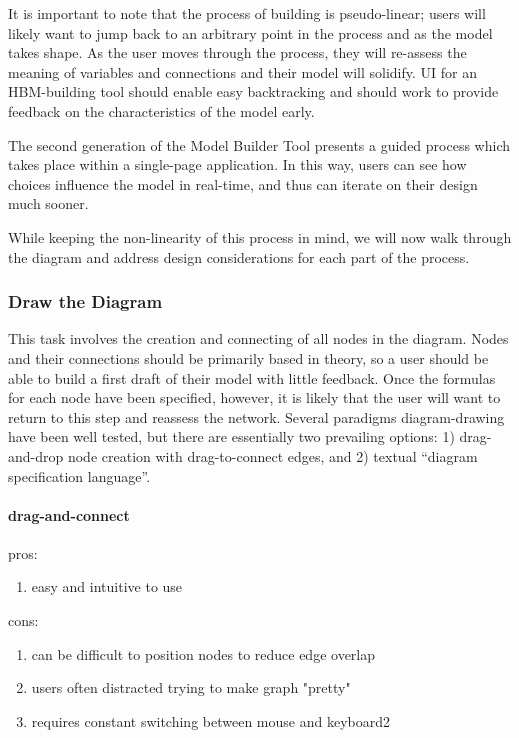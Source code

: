 \documentclass[conference]{IEEEtran}
\begin{document}
It is important to note that the process of building is pseudo-linear; users will likely want to jump back to an arbitrary point in the process and as the model takes shape. 
As the user moves through the process, they will re-assess the meaning of variables and connections and their model will solidify. 
UI for an HBM-building tool should enable easy backtracking and should work to provide feedback on the characteristics of the model early. 

The second generation of the Model Builder Tool presents a guided process which takes place within a single-page application. 
In this way, users can see how choices influence the model in real-time, and thus can iterate on their design much sooner.

While keeping the non-linearity of this process in mind, we will now walk through the diagram and address design considerations for each part of the process.

\subsubsection{Draw the Diagram}
This task involves the creation and connecting of all nodes in the diagram. 
Nodes and their connections should be primarily based in theory, so a user should be able to build a first draft of their model with little feedback. 
Once the formulas for each node have been specified, however, it is likely that the user will want to return to this step and reassess the network. 
Several paradigms diagram-drawing have been well tested, but there are essentially two prevailing options:
1) drag-and-drop node creation with drag-to-connect edges, and 2) textual ``diagram specification language''.

\paragraph{drag-and-connect}
pros:
\begin{enumerate}
  \item{easy and intuitive to use}
\end{enumerate}
cons:
\begin{enumerate}
 \item can be difficult to position nodes to reduce edge overlap
 \item users often distracted trying to make graph "pretty"
 \item requires constant switching between mouse and keyboard2
\end{enumerate}
\end{document}
